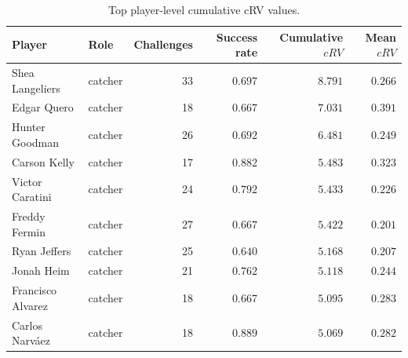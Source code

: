 \begin{table}[h]
\centering
\caption{Top player-level cumulative cRV values.}
\label{tab:leaderboard}
\small
\begin{tabular}{llrrrr}
\toprule
Player & Role & Challenges & Success rate & Cumulative $cRV$ & Mean $cRV$ \\
\midrule
Shea Langeliers & catcher & 33 & $0.697$ & $8.791$ & $0.266$ \\
Edgar Quero & catcher & 18 & $0.667$ & $7.031$ & $0.391$ \\
Hunter Goodman & catcher & 26 & $0.692$ & $6.481$ & $0.249$ \\
Carson Kelly & catcher & 17 & $0.882$ & $5.483$ & $0.323$ \\
Victor Caratini & catcher & 24 & $0.792$ & $5.433$ & $0.226$ \\
Freddy Fermin & catcher & 27 & $0.667$ & $5.422$ & $0.201$ \\
Ryan Jeffers & catcher & 25 & $0.640$ & $5.168$ & $0.207$ \\
Jonah Heim & catcher & 21 & $0.762$ & $5.118$ & $0.244$ \\
Francisco Alvarez & catcher & 18 & $0.667$ & $5.095$ & $0.283$ \\
Carlos Narváez & catcher & 18 & $0.889$ & $5.069$ & $0.282$ \\
\bottomrule
\end{tabular}
\end{table}
